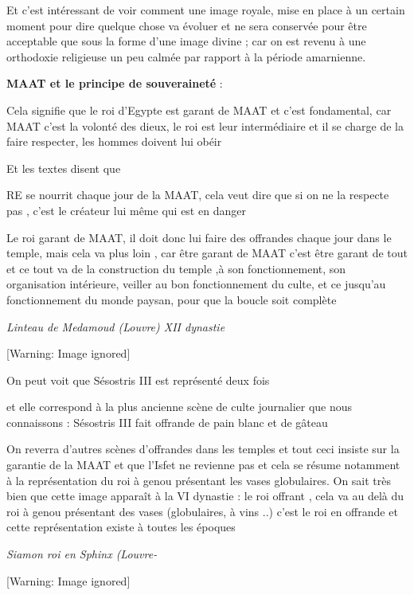 \documentclass[a4paper,10pt]{article}
\begin{document}
Et c'est intéressant de voir comment une image royale,
mise en place à un certain moment pour dire quelque chose va évoluer et
ne sera conservée pour être acceptable que sous la forme
d'une image divine ; car on est revenu à une
orthodoxie religieuse un peu calmée par rapport à la période
amarnienne.

\textbf{MAAT et le principe de souveraineté} :

Cela signifie que le roi d'Egypte est garant de MAAT et
c'est fondamental, car MAAT c'est la
volonté des dieux, le roi est leur intermédiaire et il se charge de la
faire respecter, les hommes doivent lui obéir

Et les textes disent que 

RE se nourrit chaque jour de la MAAT, cela veut dire que si on ne la
respecte pas , c'est le créateur lui même qui est en
danger

Le roi garant de MAAT, il doit donc lui faire des offrandes chaque jour
dans le temple, mais cela va plus loin , car être garant de MAAT
c'est être garant de tout et ce tout va de la
construction du temple ,à son fonctionnement, son organisation
intérieure, veiller au bon fonctionnement du culte, et ce
jusqu'au fonctionnement du monde paysan, pour que la
boucle soit complète

\textit{Linteau de Medamoud (Louvre) XII dynastie}

  [Warning: Image ignored] %
 

On peut voit que Sésostris III est représenté deux fois 

et elle correspond à la plus ancienne scène de culte journalier que nous
connaissons : Sésostris III fait offrande de pain blanc et de gâteau

On reverra d'autres scènes d'offrandes
dans les temples et tout ceci insiste sur la garantie de la MAAT et que
l'Isfet ne revienne pas et cela se résume notamment à
la représentation du roi à genou présentant les vases globulaires. On
sait très bien que cette image apparaît à la VI dynastie  : le roi
offrant , cela va au delà du roi à genou présentant des vases
(globulaires, à vins ..) c'est le roi en offrande et
cette représentation existe à toutes les époques

\textit{Siamon roi en Sphinx (Louvre-}

   [Warning: Image ignored] %
 
\end{document}
